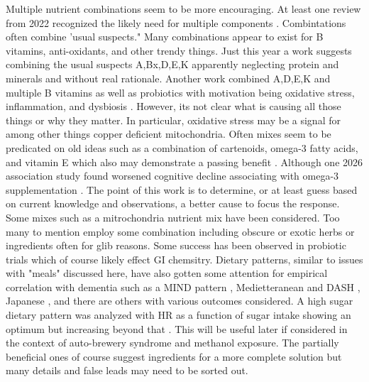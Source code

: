 {Multiple nutrient combinations seem to be more encouraging.
At least one review from 2022 recognized the likely
need for multiple components 
\cite{Alam_Vitamins_nutritional_intervention_2022}.
Combintations often combine 'usual suspects."
Many combinations appear to exist for B vitamins, anti-oxidants,
and other trendy things. 
Just this year a work suggests combining the usual suspects
A,Bx,D,E,K \cite{PMC12947704} apparently neglecting
protein and minerals  and without real rationale.
Another work combined A,D,E,K and multiple B vitamins 
as well as probiotics with motivation being oxidative stress,
inflammation, and dysbiosis \cite{Sultana_Hia_Reddy_Combinational_Therapy_2024}.
However, its not clear what is causing all those things or why
they matter. In particular, oxidative stress may be a signal for
among other things copper deficient mitochondria.
Often mixes seem to be predicated on old ideas such as a combination of
cartenoids, omega-3 fatty acids, and vitamin E which also
may demonstrate a passing benefit 
\cite{Nolan_Power_Howard_Supplementation_With_Carotenoids_Omega_2022}.
Although one 2026 association study found worsened cognitive decline
associating with omega-3 supplementation
\cite{PMID42000571}.
The point of this work is to determine, or at least guess based on
current knowledge and observations, a better cause to focus
the response.  Some mixes such as a mitrochondria nutrient mix 
\cite{Liu_Ames_Reducing_mitochondrial_decay_with_}
have been considered.
Too many to mention employ some combination including obscure or
exotic herbs or ingredients \cite{Karthika2022} often for glib reasons. 
Some success has been observed in  probiotic trials
\cite{PENG2025284} which of course likely effect GI chemsitry.
Dietary patterns, similar to issues with "meals" discussed
here, have also gotten some attention for empirical correlation
with dementia 
 such as a MIND pattern
\cite{Cornelis_Agarwal_Holland_MIND_Dietary_Pattern_2023},
Medietteranean and DASH
\cite{10.1093/nutrit/nuaf121},
Japanese 
\cite{Zhang2023},
and there are others
\cite{Shannon_Mathers_Stevenson_Healthy_dietary_patterns_cognition_2025}
 with various  outcomes considered. 
A high sugar dietary pattern was analyzed with HR as a function
of sugar intake showing an optimum but increasing beyond that 
\cite{Zhang2024}. This will be useful later if considered in the
context of auto-brewery syndrome and methanol exposure. 
The partially beneficial ones of course suggest ingredients 
for a more complete solution 
but many details and false leads may need to be sorted out. 
}%


